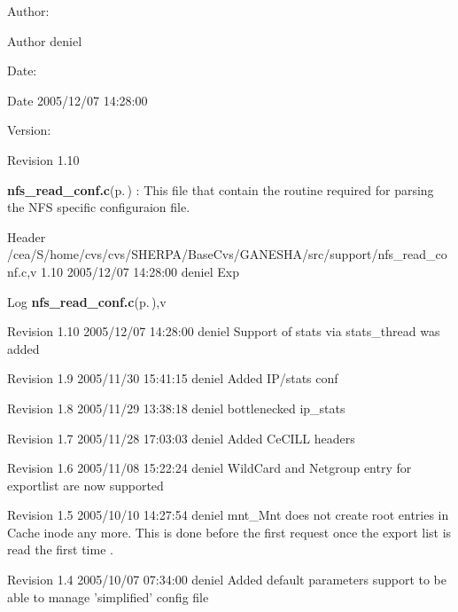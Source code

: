 \begin{Desc}
\item[Author:]\begin{Desc}
\item[Author]deniel \end{Desc}
\end{Desc}
\begin{Desc}
\item[Date:]\begin{Desc}
\item[Date]2005/12/07 14:28:00 \end{Desc}
\end{Desc}
\begin{Desc}
\item[Version:]\begin{Desc}
\item[Revision]1.10 \end{Desc}
\end{Desc}
{\bf nfs\_\-read\_\-conf.c}{\rm (p.\,\pageref{nfs__read__conf_8c})} : This file that contain the routine required for parsing the NFS specific configuraion file.

\begin{Desc}
\item[Header]/cea/S/home/cvs/cvs/SHERPA/Base\-Cvs/GANESHA/src/support/nfs\_\-read\_\-conf.c,v 1.10 2005/12/07 14:28:00 deniel Exp \end{Desc}


\begin{Desc}
\item[Log]{\bf nfs\_\-read\_\-conf.c}{\rm (p.\,\pageref{nfs__read__conf_8c})},v \end{Desc}
Revision 1.10 2005/12/07 14:28:00 deniel Support of stats via stats\_\-thread was added

Revision 1.9 2005/11/30 15:41:15 deniel Added IP/stats conf

Revision 1.8 2005/11/29 13:38:18 deniel bottlenecked ip\_\-stats

Revision 1.7 2005/11/28 17:03:03 deniel Added Ce\-CILL headers

Revision 1.6 2005/11/08 15:22:24 deniel Wild\-Card and Netgroup entry for exportlist are now supported

Revision 1.5 2005/10/10 14:27:54 deniel mnt\_\-Mnt does not create root entries in Cache inode any more. This is done before the first request once the export list is read the first time .

Revision 1.4 2005/10/07 07:34:00 deniel Added default parameters support to be able to manage 'simplified' config file

